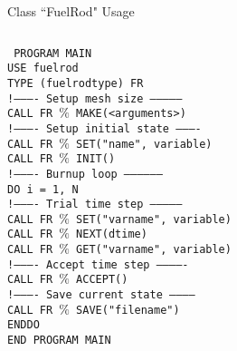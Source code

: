 \documentclass[11pt]{beamer}
\begin{document}
\begin{frame}{Class ``FuelRod" Usage}
  \footnotesize
  \begin{columns}
  \begin{block}{}
    \texttt{
    {\color{magenta}PROGRAM} MAIN\\
    {\color{magenta}USE} fuelrod\\
    {\color{magenta}TYPE} (fuelrodtype) FR\\    
    {\color{gray}!---------- Setup mesh size --------------}\\
    {\color{magenta}CALL} FR $\%$ MAKE(<arguments>)\\
    {\color{gray}!---------- Setup initial state ----------}\\    
    {\color{magenta}CALL} FR $\%$ SET({\color{orange}"name"}, variable)\\
    {\color{magenta}CALL} FR $\%$ INIT()\\
    {\color{gray}!---------- Burnup loop ------------------}\\        
    {\color{magenta}DO} i = 1, N\\
    {\color{gray}!---------- Trial time step --------------}\\            
    {\hspace{5mm}\color{magenta}CALL} FR $\%$ SET({\color{orange}"varname"}, variable)\\
    {\hspace{5mm}\color{magenta}CALL} FR $\%$ NEXT(dtime)\\
    {\hspace{5mm}\color{magenta}CALL} FR $\%$ GET({\color{orange}"varname"}, variable)\\
    {\color{gray}!---------- Accept time step -------------}\\                
    {\hspace{5mm}\color{magenta}CALL} FR $\%$ ACCEPT()\\    
    {\color{gray}!---------- Save current state -----------}\\                
    {\hspace{5mm}\color{magenta}CALL} FR $\%$ SAVE({\color{orange}"filename"})\\    
    {\color{magenta}ENDDO} \\
    {\color{magenta}END PROGRAM}  MAIN
    }        
  \end{block}
  \end{columns}
\end{frame}
\end{document}
